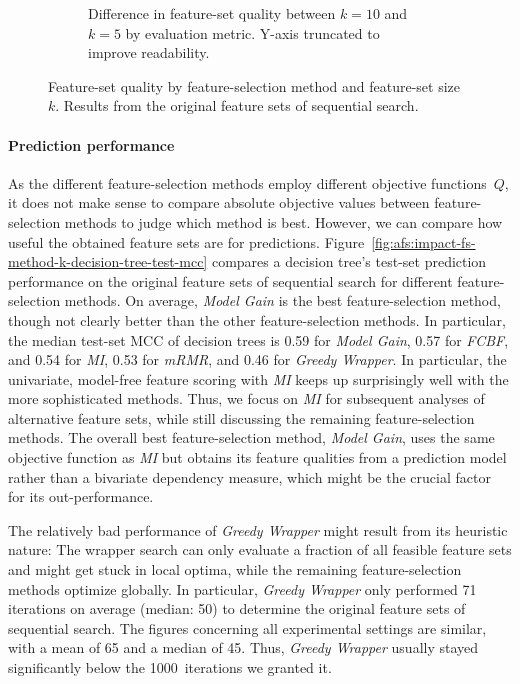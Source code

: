 \documentclass{article}
\theoremstyle{definition}
\begin{document}
\begin{figure}[htb]
\begin{subfigure}[t]{0.48\textwidth}
		\caption{
			Difference in feature-set quality between $k=10$ and $k=5$ by evaluation metric.
			Y-axis truncated to improve readability.
		}
		\label{fig:afs:impact-fs-method-k-metric-diff}
	\end{subfigure}
	\caption{
		Feature-set quality by feature-selection method and feature-set size~$k$.
		Results from the original feature sets of sequential search.
	}
	\label{fig:afs:impact-fs-method-k-quality}
\end{figure}

\paragraph{Prediction performance}

As the different feature-selection methods employ different objective functions~$Q$, it does not make sense to compare absolute objective values between feature-selection methods to judge which method is best.
However, we can compare how useful the obtained feature sets are for predictions.
Figure~\ref{fig:afs:impact-fs-method-k-decision-tree-test-mcc} compares a decision tree's test-set prediction performance on the original feature sets of sequential search for different feature-selection methods.
On average, \emph{Model Gain} is the best feature-selection method, though not clearly better than the other feature-selection methods.
In particular, the median test-set MCC of decision trees is 0.59 for \emph{Model Gain}, 0.57 for \emph{FCBF}, and 0.54 for \emph{MI}, 0.53 for \emph{mRMR}, and 0.46 for \emph{Greedy Wrapper}.
In particular, the univariate, model-free feature scoring with \emph{MI} keeps up surprisingly well with the more sophisticated methods.
Thus, we focus on \emph{MI} for subsequent analyses of alternative feature sets, while still discussing the remaining feature-selection methods.
The overall best feature-selection method, \emph{Model Gain}, uses the same objective function as \emph{MI} but obtains its feature qualities from a prediction model rather than a bivariate dependency measure, which might be the crucial factor for its out-performance. 

The relatively bad performance of \emph{Greedy Wrapper} might result from its heuristic nature:
The wrapper search can only evaluate a fraction of all feasible feature sets and might get stuck in local optima, while the remaining feature-selection methods optimize globally.
In particular, \emph{Greedy Wrapper} only performed 71 iterations on average (median: 50) to determine the original feature sets of sequential search.
The figures concerning all experimental settings are similar, with a mean of 65 and a median of 45.
Thus, \emph{Greedy Wrapper} usually stayed significantly below the 1000~iterations we granted it.
\end{document}
